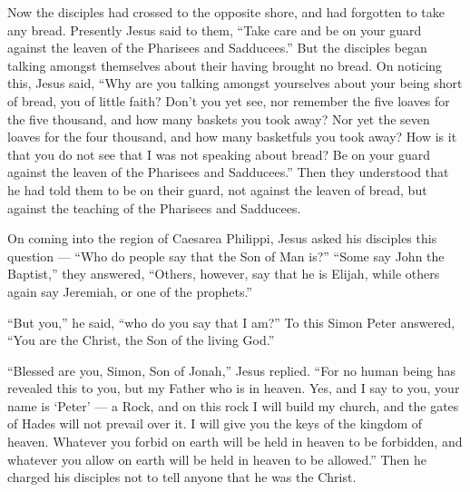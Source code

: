  Now the disciples had crossed to the opposite shore, and
had forgotten to take any bread.  Presently Jesus said to
them, ``Take care and be on your guard against the leaven of the
Pharisees and Sadducees.''  But the disciples began talking
amongst themselves about their having brought no bread.  On
noticing this, Jesus said, ``Why are you talking amongst yourselves
about your being short of bread, you of little faith?  Don't
you yet see, nor remember the five loaves for the five thousand, and how
many baskets you took away?  Nor yet the seven loaves for
the four thousand, and how many basketfuls you took away? 
How is it that you do not see that I was not speaking about bread? Be on
your guard against the leaven of the Pharisees and Sadducees.''
 Then they understood that he had told them to be on their
guard, not against the leaven of bread, but against the teaching of the
Pharisees and Sadducees.

 On coming into the region of Caesarea Philippi, Jesus
asked his disciples this question --- ``Who do people say that the Son
of Man is?''  ``Some say John the Baptist,'' they answered,
``Others, however, say that he is Elijah, while others again say
Jeremiah, or one of the prophets.''

 ``But you,'' he said, ``who do you say that I am?''
 To this Simon Peter answered, ``You are the Christ, the
Son of the living God.''

 ``Blessed are you, Simon, Son of Jonah,'' Jesus replied.
``For no human being has revealed this to you, but my Father who is in
heaven.  Yes, and I say to you, your name is `Peter' --- a
Rock, and on this rock I will build my church, and the gates of Hades
will not prevail over it.  I will give you the keys of the
kingdom of heaven. Whatever you forbid on earth will be held in heaven
to be forbidden, and whatever you allow on earth will be held in heaven
to be allowed.''  Then he charged his disciples not to tell
anyone that he was the Christ.

